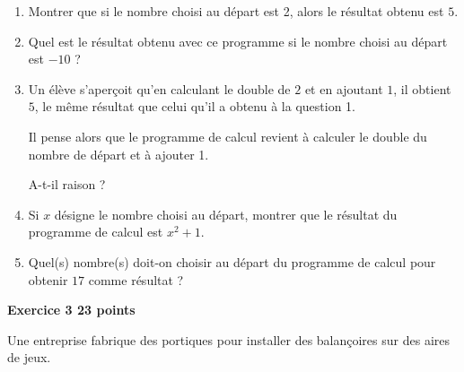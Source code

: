 \documentclass[10pt]{article}
\begin{document}
\medskip

\begin{enumerate}
\item Montrer que si le nombre choisi au départ est 2, alors le résultat obtenu est $5$.
\item Quel est le résultat obtenu avec ce programme si le nombre choisi au départ est $-10$ ?
\item Un élève s'aperçoit qu'en calculant le double de $2$ et en ajoutant $1$, il obtient $5$, le même résultat que celui qu'il a obtenu à la question 1.

Il pense alors que le programme de calcul revient à calculer le double du nombre de départ et à ajouter 1.

A-t-il raison ?
\item Si $x$ désigne le nombre choisi au départ, montrer que le résultat du programme de calcul est $x^2 + 1$.
\item Quel(s) nombre(s) doit-on choisir au départ du programme de calcul pour obtenir $17$ comme résultat ?
\end{enumerate}

\bigskip

\textbf{Exercice 3 \hfill 23 points}

\medskip

Une entreprise fabrique des portiques pour installer des balançoires sur des aires de jeux.

\medskip
\end{document}
